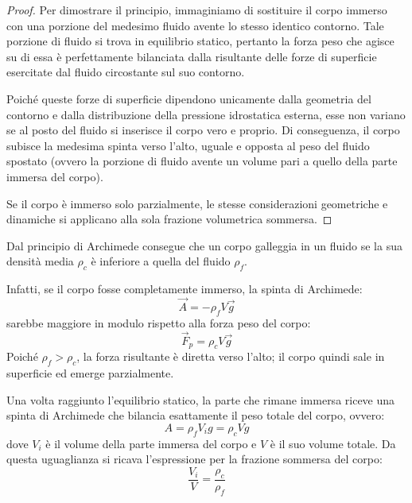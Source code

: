 \documentclass[11pt, a4paper, openright]{book}
\theoremstyle{plain}
\theoremstyle{definition}
\begin{document}
\begin{proof}
    Per dimostrare il principio, immaginiamo di sostituire il corpo immerso con una porzione del medesimo fluido avente lo stesso identico contorno. Tale porzione di fluido si trova in equilibrio statico, pertanto la forza peso che agisce su di essa è perfettamente bilanciata dalla risultante delle forze di superficie esercitate dal fluido circostante sul suo contorno.
    
    Poiché queste forze di superficie dipendono unicamente dalla geometria del contorno e dalla distribuzione della pressione idrostatica esterna, esse non variano se al posto del fluido si inserisce il corpo vero e proprio. Di conseguenza, il corpo subisce la medesima spinta verso l'alto, uguale e opposta al peso del fluido spostato (ovvero la porzione di fluido avente un volume pari a quello della parte immersa del corpo).

    Se il corpo è immerso solo parzialmente, le stesse considerazioni geometriche e dinamiche si applicano alla sola frazione volumetrica sommersa.
\end{proof}

Dal principio di Archimede consegue che un corpo galleggia in un fluido se la sua densità media $\rho_c$ è inferiore a quella del fluido $\rho_f$.

Infatti, se il corpo fosse completamente immerso, la spinta di Archimede:
\begin{equation}
    \vec{A} = -\rho_f V \vec{g}
\end{equation}
sarebbe maggiore in modulo rispetto alla forza peso del corpo:
\begin{equation}
    \vec{F}_{p} = \rho_c V \vec{g}
\end{equation}
Poiché $\rho_f > \rho_c$, la forza risultante è diretta verso l'alto; il corpo quindi sale in superficie ed emerge parzialmente.

Una volta raggiunto l'equilibrio statico, la parte che rimane immersa riceve una spinta di Archimede che bilancia esattamente il peso totale del corpo, ovvero:
\begin{equation}
    A = \rho_f V_i g = \rho_c V g
\end{equation}
dove $V_i$ è il volume della parte immersa del corpo e $V$ è il suo volume totale. Da questa uguaglianza si ricava l'espressione per la frazione sommersa del corpo:
\begin{equation}
    \frac{V_i}{V} = \frac{\rho_c}{\rho_f}
\end{equation}
\end{document}
